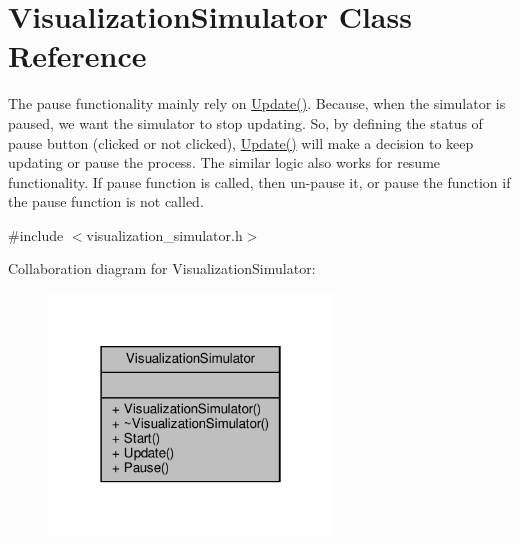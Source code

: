 \hypertarget{classVisualizationSimulator}{}\section{Visualization\+Simulator Class Reference}
\label{classVisualizationSimulator}


The pause functionality mainly rely on \hyperlink{classVisualizationSimulator_a211b13dd71e679f58bd645089ae10319}{Update()}. Because, when the simulator is paused, we want the simulator to stop updating. So, by defining the status of pause button (clicked or not clicked), \hyperlink{classVisualizationSimulator_a211b13dd71e679f58bd645089ae10319}{Update()} will make a decision to keep updating or pause the process. The similar logic also works for resume functionality. If pause function is called, then un-\/pause it, or pause the function if the pause function is not called.  




{\ttfamily \#include $<$visualization\+\_\+simulator.\+h$>$}



Collaboration diagram for Visualization\+Simulator\+:\nopagebreak
\begin{figure}[H]
\begin{center}
\leavevmode
\includegraphics[width=214pt]{classVisualizationSimulator__coll__graph}
\end{center}
\end{figure}
